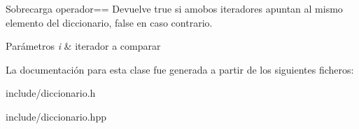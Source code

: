 Sobrecarga operador== Devuelve true si amobos iteradores apuntan al mismo elemento del diccionario, false en caso contrario. 


\begin{DoxyParams}{Parámetros}
{\em i} & iterador a comparar \\
\hline
\end{DoxyParams}


La documentación para esta clase fue generada a partir de los siguientes ficheros\+:\begin{DoxyCompactItemize}
\item 
include/diccionario.\+h\item 
include/diccionario.\+hpp\end{DoxyCompactItemize}
